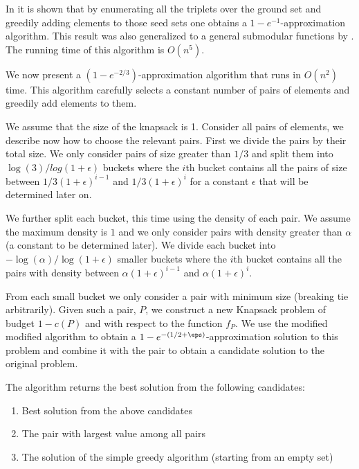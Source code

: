 In \cite{khuller1999budgeted} it is shown that by enumerating all the triplets over the 
ground set and greedily adding elements to those seed sets one obtains a 
$1-e^{-1}$-approximation algorithm.
This result was also generalized to a general submodular functions by \cite{sviridenko2004note}.
The running time of this algorithm is $O(n^5)$.

We now present a $(1-e^{-2/3})$-approximation algorithm that runs in $O(n^2)$ time.
This algorithm carefully selects a constant number of pairs of elements and greedily 
add elements to them.

We assume that the size of the knapsack is 1.
Consider all pairs of elements, we describe now how to choose the relevant pairs.
First we divide the pairs by their total size. 
We only consider pairs of size greater than $1/3$ and split them 
into $\log(3)/log(1 + \epsilon)$ buckets where the $i$th bucket contains all the pairs of size
between $1/3(1 + \epsilon)^{i - 1}$ and $1/3(1 + \epsilon)^{i}$  
for a constant $\epsilon$ that will be determined later on.

We further split each bucket, this time using the density of each pair.
We assume the maximum density is $1$ and we only consider pairs with density greater than 
$\alpha$ (a constant to be determined later). 
We divide each bucket into $-\log(\alpha)/\log(1 + \epsilon)$ smaller buckets where
the $i$th bucket contains all the pairs with density between $\alpha (1 + \epsilon)^{i - 1}$
and $\alpha (1 + \epsilon)^{i}$.

From each small bucket we only consider a pair with minimum size (breaking tie arbitrarily). 
Given such a pair, $P$, we construct a new Knapsack problem of budget $1 - c(P)$ and with 
respect to the function $f_P$.
We use the modified modified algorithm to obtain a $1-e^{-(1/2 + \eps)}$-approximation
solution to this problem and combine it with the pair to obtain a candidate 
solution to the original problem.

The algorithm returns the best solution from the following candidates:
\begin{enumerate}
  \item Best solution from the above candidates
  \item The pair with  largest value among all pairs
  \item The solution of the simple greedy algorithm (starting from an empty set)
\end{enumerate}       

